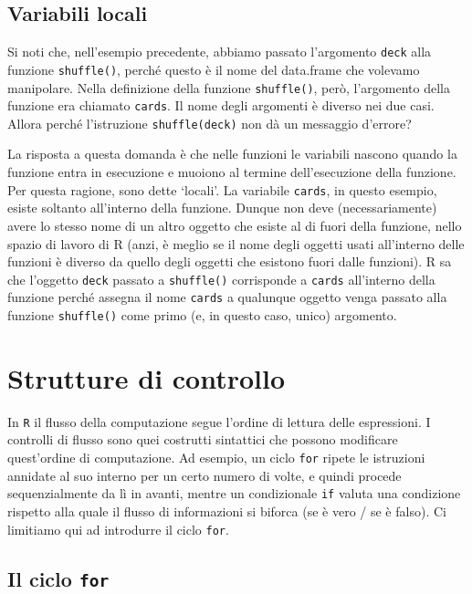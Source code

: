 \documentclass[
]{memoir}
\theoremstyle{definition}
\theoremstyle{definition}
\theoremstyle{definition}
\theoremstyle{definition}
\theoremstyle{remark}
\begin{document}
\hypertarget{variabili-locali}{%
\subsection{Variabili locali}\label{variabili-locali}}

Si noti che, nell'esempio precedente, abbiamo passato l'argomento \texttt{deck}
alla funzione \texttt{shuffle()}, perché questo è il nome del data.frame che
volevamo manipolare. Nella definizione della funzione \texttt{shuffle()}, però,
l'argomento della funzione era chiamato \texttt{cards}. Il nome degli argomenti
è diverso nei due casi. Allora perché l'istruzione \texttt{shuffle(deck)} non
dà un messaggio d'errore?

La risposta a questa domanda è che nelle funzioni le variabili nascono
quando la funzione entra in esecuzione e muoiono al termine
dell'esecuzione della funzione. Per questa ragione, sono dette `locali'.
La variabile \texttt{cards}, in questo esempio, esiste soltanto all'interno
della funzione. Dunque non deve (necessariamente) avere lo stesso nome
di un altro oggetto che esiste al di fuori della funzione, nello spazio
di lavoro di R (anzi, è meglio se il nome degli oggetti usati
all'interno delle funzioni è diverso da quello degli oggetti che
esistono fuori dalle funzioni). R sa che l'oggetto \texttt{deck} passato a
\texttt{shuffle()} corrisponde a \texttt{cards} all'interno della funzione perché
assegna il nome \texttt{cards} a qualunque oggetto venga passato alla funzione
\texttt{shuffle()} come primo (e, in questo caso, unico) argomento.

\hypertarget{chapter-strut-contr}{%
\section{Strutture di controllo}\label{chapter-strut-contr}}

In \texttt{R} il flusso della computazione segue l'ordine di lettura delle espressioni. I controlli di flusso sono quei costrutti sintattici che possono modificare quest'ordine di computazione. Ad esempio, un ciclo \texttt{for} ripete le istruzioni annidate al suo interno per un certo numero di volte, e quindi procede sequenzialmente da lì in avanti, mentre un condizionale \texttt{if} valuta una condizione rispetto alla quale il flusso di informazioni si biforca (se è vero / se è falso). Ci limitiamo qui ad introdurre il ciclo \texttt{for}.

\hypertarget{il-ciclo-for}{%
\subsection{\texorpdfstring{Il ciclo \texttt{for}}{Il ciclo for}}\label{il-ciclo-for}}
\end{document}
